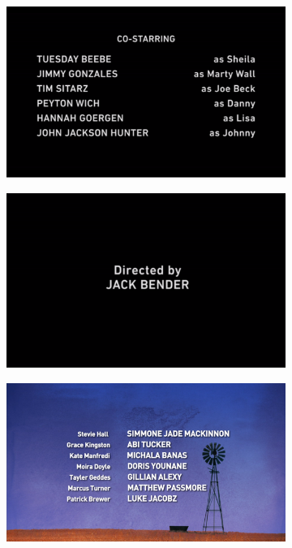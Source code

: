 \documentclass{article}
\begin{document}
\begin{figure}[H]
  \centering
  \begin{subfigure}[b]{0.4\textwidth}
    \includegraphics[width=\textwidth]{images/screencreditslarge.png}
  \end{subfigure}
  \begin{subfigure}[b]{0.4\textwidth}
    \includegraphics[width=\textwidth]{images/screencreditslarge2.png}
  \end{subfigure}
\begin{subfigure}[b]{0.4\textwidth}
	\includegraphics[width=\textwidth]{images/diffcredits.png}

\end{subfigure}
\end{figure}
\end{document}
